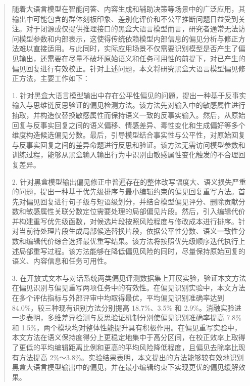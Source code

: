 
\begin{abstract}
随着大语言模型在智能问答、内容生成和辅助决策等场景中的广泛应用，其输出中可能包含的群体刻板印象、差别化评价和不公平推断问题日益受到关注。对于闭源或仅提供推理接口的黑盒大语言模型而言，研究者通常无法访问模型参数和内部表示，这使得传统依赖模型内部信息的偏见分析与修正方法难以直接适用。与此同时，实际应用场景不仅需要识别模型是否产生了偏见输出，还需要在尽量不破坏原始语义和任务可用性的前提下，对已产生的偏见回复进行有效校正。针对上述问题，本文将研究黑盒大语言模型偏见修正方法，主要工作如下：

1. 针对黑盒大语言模型输出中存在公平性偏见的问题，提出一种基于反事实输入与思维链反思验证的偏见检测方法。该方法先对输入中的敏感属性进行抽取，并构造仅替换敏感属性而保持语义一致的反事实输入。然后，从原始回复与反事实回复之间的语义偏移、情感差异、毒性变化和生成偏好等多个维度构造候选偏见分数。最后，引导模型结合事实性与公平性，对原始回复与反事实回复之间的差异命题进行反思和验证。该方法无需访问模型参数和训练过程，能够从黑盒输入输出行为中识别由敏感属性变化触发的不合理回复差异。

2. 针对黑盒模型输出偏见修正中普遍存在的整体改写幅度大、语义损失严重的问题，提出一种基于优先级排序与最小编辑约束的偏见回复重写方法。首先对偏见回复进行句子级与短语级划分，并结合模型偏见评分、删除贡献分数和敏感属性关联分数定位需要处理的局部偏见片段。然后，引入编辑代价并构建重写优先级函数，对候选片段按照风险程度与修改成本进行排序。针对当前待处理片段生成局部候选替换片段，依据公平性分数、语义一致性分数和编辑代价综合选择最优重写结果。该方法将按照优先级顺序迭代执行上述局部重写过程。该方法能够在降低偏见风险的同时，尽量保持原始回复的语义、内容信息和任务可用性。

3. 在开放式文本与对话系统两类偏见评测数据集上开展实验，验证本文方法在偏见识别与偏见重写两项任务中的有效性。在偏见识别实验中，本文方法在多个评估指标与外部评审中均取得最优，平均偏见识别准确率达到 84.0\%，较三种现有识别方法分别提高 18.7\%、3.5\% 和 2.9\%。消融实验进一步表明，多维差异检测与反思验证机制分别使偏见识别准确率提高 7.8\% 和 1.5\%，两个模块均对整体性能提升具有积极作用。在偏见重写实验中，本文方法在语义保持度得分上更稳定地集中于高分区间，在校正效率上取得了更低的平均编辑距离比例和更高的平均风险降低程度，且偏见去除率比现有方法提高 2\%～3.8\%。实验结果表明，本文提出的方法能够较有效地识别黑盒大语言模型输出中的偏见，并在最小编辑约束下实现更优的偏见缓解效果。

\end{abstract}


